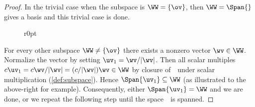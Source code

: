 \begin{proof} 
In the trivial case when the subspace is \(\WW=\{\ov\}\), then \(\WW=\Span\{\}\) gives a basis and this trivial case is done.

\begin{figure}r{0pt}
\end{figure}
For every other subspace \(\WW\neq\{\ov\}\) there exists a nonzero vector \(\wv\in\WW\).
Normalize the vector by setting \(\uv_1=\wv/|\wv|\).
Then all scalar multiples \(c\uv_1=c\wv/|\wv|=(c/|\wv|)\wv\in\WW\) by closure of~\WW\ under scalar multiplication (\cref{def:subspace}). 
Hence \(\Span\{\uv_1\}\subseteq\WW\) (as illustrated to the above-right for example).
Consequently, either  \(\Span\{\uv_1\}=\WW\) and we are done, or we repeat the following step until the space~\WW\ is spanned.


\end{proof}
